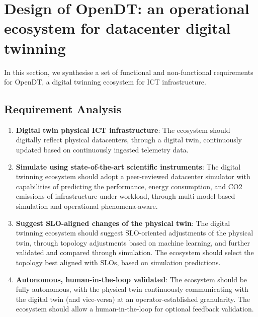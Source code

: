\section{Design of OpenDT: an operational ecosystem for datacenter digital twinning}\label{sec:design}

In this section, we synthesise a set of functional and non-functional requirements for OpenDT, a digital twinning ecosystem for ICT infrastructure.

\subsection{Requirement Analysis}\label{sec:design:requirements}

\begin{enumerate}[label=\textbf{(FR\arabic*)},leftmargin=0pt,itemindent=3em]
    \item \label{design:fr1} \textbf{Digital twin physical ICT infrastructure}: The ecosystem should digitally reflect physical datacenters, through a digital twin, continuously updated based on continuously ingested telemetry data. 
    \item \label{design:fr2} \textbf{Simulate using state-of-the-art scientific instruments}: The digital twinning ecosystem should adopt a peer-reviewed datacenter simulator with capabilities of predicting the performance, energy consumption, and CO2 emissions of infrastructure under workload, through multi-model-based simulation and operational phenomena-aware.
    \item \label{design:fr3} \textbf{Suggest SLO-aligned changes of the physical twin}: The digital twinning ecosystem should suggest SLO-oriented adjustments of the physical twin, through topology adjustments based on machine learning, and further validated and compared through simulation. The ecosystem should select the topology best aligned with SLOs, based on simulation predictions.
    \item \label{design:fr4} \textbf{Autonomous, human-in-the-loop validated}: The ecosystem should be fully autonomous, with the physical twin continuously communicating with the digital twin (and vice-versa) at an operator-established granularity. The ecosystem should allow a human-in-the-loop for optional feedback validation.
\end{enumerate}


